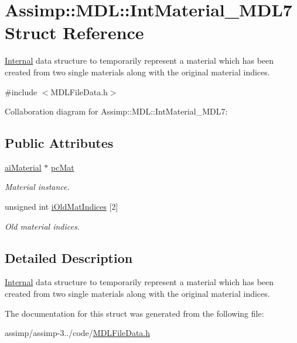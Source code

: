 \hypertarget{struct_assimp_1_1_m_d_l_1_1_int_material___m_d_l7}{\section{Assimp\+:\+:M\+D\+L\+:\+:Int\+Material\+\_\+\+M\+D\+L7 Struct Reference}
\label{struct_assimp_1_1_m_d_l_1_1_int_material___m_d_l7}
}


\hyperlink{struct_internal}{Internal} data structure to temporarily represent a material which has been created from two single materials along with the original material indices.  




{\ttfamily \#include $<$M\+D\+L\+File\+Data.\+h$>$}



Collaboration diagram for Assimp\+:\+:M\+D\+L\+:\+:Int\+Material\+\_\+\+M\+D\+L7\+:
\subsection*{Public Attributes}
\begin{DoxyCompactItemize}
\item 
\hypertarget{struct_assimp_1_1_m_d_l_1_1_int_material___m_d_l7_aa2886a3770d37a2585a19007fbbb6af4}{\hyperlink{classai_material}{ai\+Material} $\ast$ \hyperlink{struct_assimp_1_1_m_d_l_1_1_int_material___m_d_l7_aa2886a3770d37a2585a19007fbbb6af4}{pc\+Mat}}\label{struct_assimp_1_1_m_d_l_1_1_int_material___m_d_l7_aa2886a3770d37a2585a19007fbbb6af4}

\begin{DoxyCompactList}\small\item\em Material instance. \end{DoxyCompactList}\item 
\hypertarget{struct_assimp_1_1_m_d_l_1_1_int_material___m_d_l7_a00d4f1b94881326131c57347f0a95a19}{unsigned int \hyperlink{struct_assimp_1_1_m_d_l_1_1_int_material___m_d_l7_a00d4f1b94881326131c57347f0a95a19}{i\+Old\+Mat\+Indices} \mbox{[}2\mbox{]}}\label{struct_assimp_1_1_m_d_l_1_1_int_material___m_d_l7_a00d4f1b94881326131c57347f0a95a19}

\begin{DoxyCompactList}\small\item\em Old material indices. \end{DoxyCompactList}\end{DoxyCompactItemize}


\subsection{Detailed Description}
\hyperlink{struct_internal}{Internal} data structure to temporarily represent a material which has been created from two single materials along with the original material indices. 

The documentation for this struct was generated from the following file\+:\begin{DoxyCompactItemize}
\item 
assimp/assimp-\/3../code/\hyperlink{_m_d_l_file_data_8h}{M\+D\+L\+File\+Data.\+h}\end{DoxyCompactItemize}
